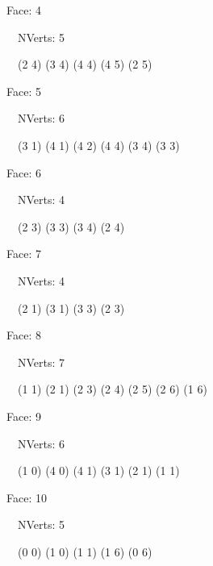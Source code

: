 \documentclass{article}
\begin{document}
    {\footnotesize

    Face: 4

    \   \    NVerts: 5

     \   \   (2 4) (3 4) (4 4) (4 5) (2 5)}

    {\footnotesize

    Face: 5

    \   \    NVerts: 6

     \   \   (3 1) (4 1) (4 2) (4 4) (3 4) (3 3)}

    {\footnotesize

    Face: 6

    \   \    NVerts: 4

     \   \   (2 3) (3 3) (3 4) (2 4)}

    {\footnotesize

    Face: 7

    \   \    NVerts: 4

     \   \   (2 1) (3 1) (3 3) (2 3)}

    {\footnotesize

    Face: 8

    \   \    NVerts: 7

     \   \   (1 1) (2 1) (2 3) (2 4) (2 5) (2 6) (1 6)}

    {\footnotesize

    Face: 9

    \   \    NVerts: 6

     \   \   (1 0) (4 0) (4 1) (3 1) (2 1) (1 1)}

    {\footnotesize

    Face: 10

    \   \    NVerts: 5

     \   \   (0 0) (1 0) (1 1) (1 6) (0 6)}


     \newpage
\end{document}
